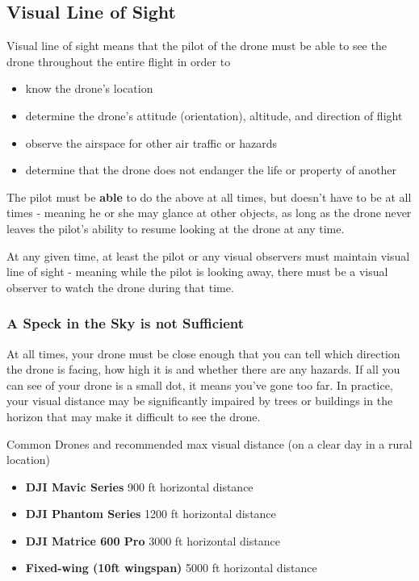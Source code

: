 \documentclass[
  12pt,
]{book}
\providecommand{\tightlist}{%
  \setlength{\itemsep}{0pt}\setlength{\parskip}{0pt}}
\begin{document}
\subsection{Visual Line of Sight}\label{visual-line-of-sight}

Visual line of sight means that the pilot of the drone must be able to see the drone throughout the entire flight in order to

\begin{itemize}
\tightlist
\item
  know the drone's location
\item
  determine the drone's attitude (orientation), altitude, and direction of flight
\item
  observe the airspace for other air traffic or hazards
\item
  determine that the drone does not endanger the life or property of another
\end{itemize}

The pilot must be \textbf{able} to do the above at all times, but doesn't have to be at all times - meaning he or she may glance at other objects, as long as the drone never leaves the pilot's ability to resume looking at the drone at any time.

At any given time, at least the pilot or any visual observers must maintain visual line of sight - meaning while the pilot is looking away, there must be a visual observer to watch the drone during that time.

\subsubsection{A Speck in the Sky is not Sufficient}\label{a-speck-in-the-sky-is-not-sufficient}

At all times, your drone must be close enough that you can tell which direction the drone is facing, how high it is and whether there are any hazards. If all you can see of your drone is a small dot, it means you've gone too far. In practice, your visual distance may be significantly impaired by trees or buildings in the horizon that may make it difficult to see the drone.

Common Drones and recommended max visual distance (on a clear day in a rural location)

\begin{itemize}
\tightlist
\item
  \textbf{DJI Mavic Series} 900 ft horizontal distance
\item
  \textbf{DJI Phantom Series} 1200 ft horizontal distance
\item
  \textbf{DJI Matrice 600 Pro} 3000 ft horizontal distance
\item
  \textbf{Fixed-wing (10ft wingspan)} 5000 ft horizontal distance
\end{itemize}
\end{document}
